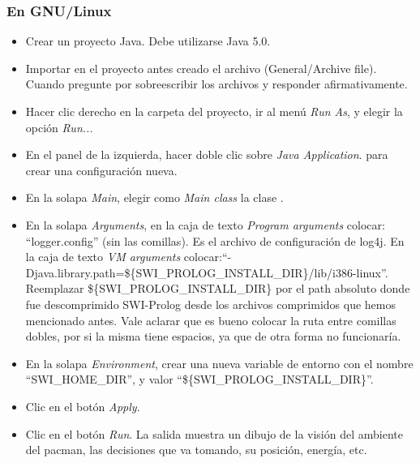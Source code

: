 \subsubsection{En GNU/Linux}
\begin{itemize}

\item Crear un proyecto Java. Debe utilizarse Java 5.0.

\item Importar en el proyecto antes creado el archivo 
(General/Archive file).  Cuando pregunte por sobreescribir los archivos
 y  responder afirmativamente.

\item Hacer clic derecho en la carpeta del proyecto, ir al menú \emph{Run As},
y elegir la opción \emph{Run...}

\item En el panel de la izquierda, hacer doble clic sobre \emph{Java Application}.
para crear una configuración nueva.

\item En la solapa \emph{Main}, elegir como \emph{Main class} la clase .

\item En la solapa \emph{Arguments}, en la caja de texto \emph{Program arguments} colocar:
``logger.config'' (sin las comillas). Es el archivo de configuración de log4j. En la caja de texto \emph{VM arguments}
colocar:\newline``-Djava.library.path=\$\{SWI\_PROLOG\_INSTALL\_DIR\}/lib/i386-linux''.\newline
Reemplazar \$\{SWI\_PROLOG\_INSTALL\_DIR\} por el path absoluto donde fue descomprimido SWI-Prolog desde los
archivos comprimidos que hemos mencionado antes. Vale aclarar que es bueno colocar la ruta entre comillas
dobles, por si la misma tiene espacios, ya que de otra forma no funcionaría.

\item En la solapa \emph{Environment}, crear una nueva variable de entorno con el nombre ``SWI\_HOME\_DIR'',
y valor ``\$\{SWI\_PROLOG\_INSTALL\_DIR\}''.

\item Clic en el botón \emph{Apply}.

\item Clic en el botón \emph{Run}. La salida muestra un dibujo de la visión del ambiente del pacman,
las decisiones que va tomando, su posición, energía, etc.

\end{itemize}


